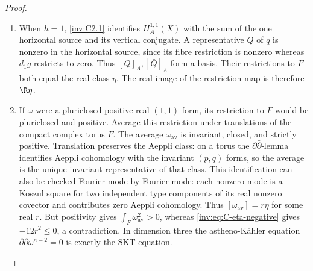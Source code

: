 \begin{proof}
\begin{enumerate}[label=\arabic*.,leftmargin=*]
\item When $h=1$, \ref{inv:C2.1} identifies $H_A^{1,1}(X)$ with the sum of the
one horizontal source and its vertical conjugate.  A representative
$Q$ of $q$ is nonzero in the horizontal source, since its fibre
restriction is nonzero whereas $d_1g$ restricts to zero.  Thus
$[Q]_A,[\bar Q]_A$ form a basis.  Their restrictions to $F$ both
equal the real class $\eta$.  The real image of the restriction map
is therefore $\R\eta$.

\item If $\omega$ were a pluriclosed positive real $(1,1)$ form, its
restriction to $F$ would be pluriclosed and positive.  Average this
restriction under translations of the compact complex torus $F$.
The average $\omega_{\mathrm{av}}$ is invariant, closed, and
strictly positive.  Translation preserves the Aeppli class: on a
torus the $\partial\bar\partial$-lemma identifies Aeppli
cohomology with the invariant $(p,q)$ forms, so the average is the
unique invariant representative of that class.  This identification
can also be checked Fourier mode by Fourier mode: each nonzero mode
is a Koszul square for two independent type components of its real
nonzero covector and contributes zero Aeppli cohomology.  Thus
$[\omega_{\mathrm{av}}]=r\eta$ for some real $r$.
But positivity gives $\int_F\omega_{\mathrm{av}}^2>0$, whereas
\eqref{inv:eq:C-eta-negative} gives $-12r^2\le0$, a contradiction.
In dimension three the astheno-K\"ahler equation
$\partial\bar\partial\omega^{n-2}=0$ is exactly the SKT equation.
\end{enumerate}
\end{proof}